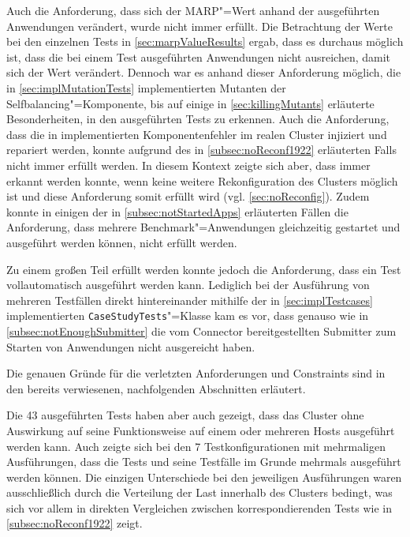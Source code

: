 Auch die Anforderung, dass sich der MARP"=Wert anhand der ausgeführten Anwendungen verändert, wurde nicht immer erfüllt.
Die Betrachtung der Werte bei den einzelnen Tests in \autoref{sec:marpValueResults} ergab, dass es durchaus möglich ist, dass die bei einem Test ausgeführten Anwendungen nicht ausreichen, damit sich der Wert verändert.
Dennoch war es anhand dieser Anforderung möglich, die in \autoref{sec:implMutationTests} implementierten Mutanten der Selfbalancing"=Komponente, bis auf einige in \autoref{sec:killingMutants} erläuterte Besonderheiten, in den ausgeführten Tests zu erkennen.
Auch die Anforderung, dass die in  implementierten Komponentenfehler im realen Cluster injiziert und repariert werden, konnte aufgrund des in \autoref{subsec:noReconf1922} erläuterten Falls nicht immer erfüllt werden.
In diesem Kontext zeigte sich aber, dass immer erkannt werden konnte, wenn keine weitere Rekonfiguration des Clusters möglich ist und diese Anforderung somit erfüllt wird (vgl. \autoref{sec:noReconfig}).
Zudem konnte in einigen der in \autoref{subsec:notStartedApps} erläuterten Fällen die Anforderung, dass mehrere Benchmark"=Anwendungen gleichzeitig gestartet und ausgeführt werden können, nicht erfüllt werden.

Zu einem großen Teil erfüllt werden konnte jedoch die Anforderung, dass ein Test vollautomatisch ausgeführt werden kann.
Lediglich bei der Ausführung von mehreren Testfällen direkt hintereinander mithilfe der in \autoref{sec:implTestcases} implementierten \texttt{CaseStudyTests}"=Klasse kam es vor, dass genauso wie in \autoref{subsec:notEnoughSubmitter} die vom Connector bereitgestellten Submitter zum Starten von Anwendungen nicht ausgereicht haben.

Die genauen Gründe für die verletzten Anforderungen und Constraints sind in den bereits verwiesenen, nachfolgenden Abschnitten erläutert.

Die 43 ausgeführten Tests haben aber auch gezeigt, dass das Cluster ohne Auswirkung auf seine Funktionsweise auf einem oder mehreren Hosts ausgeführt werden kann.
Auch zeigte sich bei den 7 Testkonfigurationen mit mehrmaligen Ausführungen, dass die Tests und seine Testfälle im Grunde mehrmals ausgeführt werden können.
Die einzigen Unterschiede bei den jeweiligen Ausführungen waren ausschließlich durch die Verteilung der Last innerhalb des Clusters bedingt, was sich vor allem in direkten Vergleichen zwischen korrespondierenden Tests wie \zB in \autoref{subsec:noReconf1922} zeigt.
